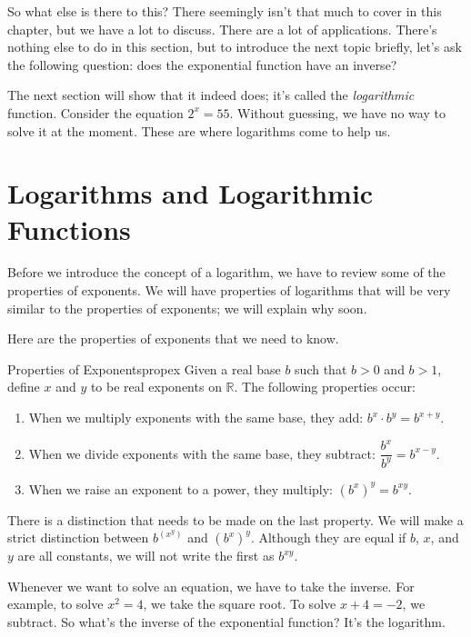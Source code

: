 \documentclass[../book.tex]{subfiles}
\begin{document}
So what else is there to this?  There seemingly isn't that much to cover in this chapter, but we have a lot to discuss.  There are a lot of applications.  There's nothing else to do in this section, but to introduce the next topic briefly, let's ask the following question: does the exponential function have an inverse?

The next section will show that it indeed does; it's called the \textit{logarithmic} function.  Consider the equation $2^x=55$.  Without guessing, we have no way to solve it at the moment.  These are where logarithms come to help us.
\section{Logarithms and Logarithmic Functions}
\noindent Before we introduce the concept of a logarithm, we have to review some of the properties of exponents.  We will have properties of logarithms that will be very similar to the properties of exponents; we will explain why soon.

Here are the properties of exponents that we need to know.
\begin{theorem}{Properties of Exponents}{propex}
Given a real base $b$ such that $b>0$ and $b>1$, define $x$ and $y$ to be real exponents on $\mathbb{R}$.  The following properties occur: \begin{enumerate}
    \item When we multiply exponents with the same base, they add: $b^x \cdot b^y=b^{x+y}$.
    \item When we divide exponents with the same base, they subtract: $\dfrac{b^x}{b^y}=b^{x-y}$.
    \item When we raise an exponent to a power, they multiply: $\left(b^x\right)^y=b^{xy}$.
\end{enumerate}
\end{theorem}
\begin{note}
There is a distinction that needs to be made on the last property.  We will make a strict distinction between $b^{\left(x^y\right)}$ and $\left(b^x\right)^y$.  Although they are equal if $b$, $x$, and $y$ are all constants, we will not write the first as $b^{xy}$.
\end{note}

Whenever we want to solve an equation, we have to take the inverse.  For example, to solve $x^2=4$, we take the square root.  To solve $x+4=-2$, we subtract.  So what's the inverse of the exponential function? It's the logarithm.
\end{document}
